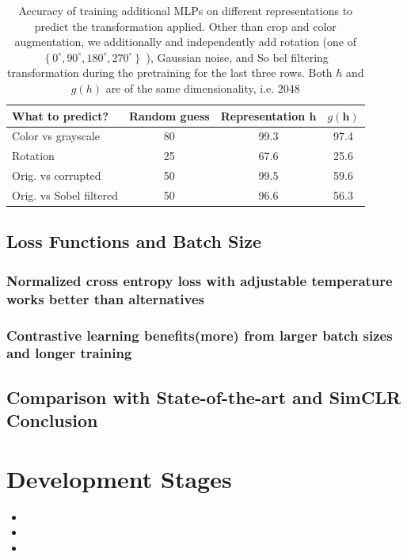 \documentclass[]{IEEEtran}
\begin{document}
\begin{table}[!ht]
\caption{Accuracy of training additional MLPs on different representations to predict the transformation applied. Other than crop and color augmentation, we additionally and independently add rotation (one of $\left\{0^{\circ}, 90^{\circ}, 180^{\circ}, 270^{\circ}\right\}$ ), Gaussian noise, and So bel filtering transformation during the pretraining for the last three rows. Both $h$ and $g(h)$ are of the same dimensionality, i.e. 2048}
\label{table3}
\begin{tabular}{lccc}
\hline What to predict? & Random guess & Representation $\boldsymbol{h}$ & $g(\boldsymbol{h})$ \\
\hline Color vs grayscale & 80 & 99.3 & 97.4 \\
Rotation & 25 & 67.6 & 25.6 \\
Orig. vs corrupted & 50 & 99.5 & 59.6 \\
Orig. vs Sobel filtered & 50 & 96.6 & 56.3 \\
\hline
\end{tabular}
\end{table}

\subsection{Loss Functions and Batch Size}
\subsubsection{Normalized cross entropy loss with adjustable temperature works better than alternatives }
\subsubsection{Contrastive learning beneﬁts(more) from larger batch sizes and longer training}
\subsection{Comparison with State-of-the-art and SimCLR Conclusion}

\section{Development Stages}

\begin{itemize}
    \item 
    \item 
    \item 
\end{itemize}
\end{document}
